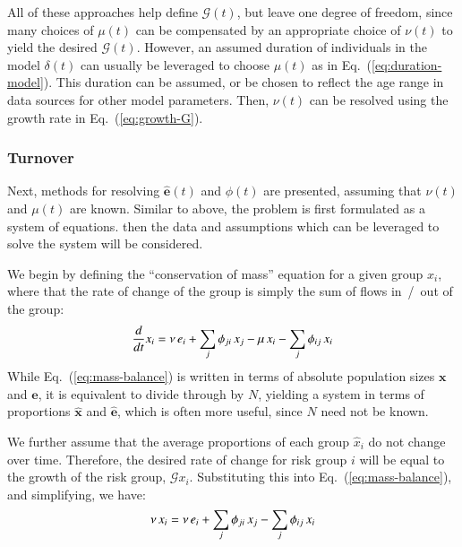 All of these approaches help define $\mathcal{G}(t)$, but leave one degree of freedom,
since many choices of $\mu(t)$ can be compensated by an appropriate choice of $\nu(t)$
to yield the desired $\mathcal{G}(t)$.
However, an assumed duration of individuals in the model $\delta(t)$
can usually be leveraged to choose $\mu(t)$ as in Eq.~(\ref{eq:duration-model}).
This duration can be assumed,
or be chosen to reflect the age range in data sources for other model parameters.
Then, $\nu(t)$ can be resolved using the growth rate in Eq.~(\ref{eq:growth-G}).
\subsubsection{Turnover}\label{sss:params-turnover}
Next, methods for resolving $\bm{\hat{e}}(t)$ and $\phi(t)$
are presented, assuming that $\nu(t)$ and $\mu(t)$ are known.
Similar to above, the problem is first formulated as a system of equations.
then the data and assumptions which can be leveraged to solve the system will be considered.
\par
We begin by defining the ``conservation of mass'' equation for a given group $x_i$,
where that the rate of change of the group
is simply the sum of flows in~/~out of the group:
\begin{equation}\label{eq:mass-balance}
\frac{d}{dt}x_i
= \nu \thinspace e_i + \sum_{j}{\phi_{ji} \thinspace x_j}
- \mu \thinspace x_i - \sum_{j}{\phi_{ij} \thinspace x_i}
\end{equation}
While Eq.~(\ref{eq:mass-balance}) is written in terms of
absolute population sizes $\bm{x}$ and $\bm{e}$,
it is equivalent to divide through by $N$, yielding a system in terms of
proportions $\bm{\hat{x}}$ and $\bm{\hat{e}}$,
which is often more useful, since $N$ need not be known.
\par
We further assume that the average proportions of each group $\hat{x}_i$ do not change over time.
Therefore, the desired rate of change for risk group $i$
will be equal to the growth of the risk group, $\mathcal{G} x_i$.
Substituting this into Eq.~(\ref{eq:mass-balance}),
and simplifying, we have:
\begin{equation}\label{eq:system}
\nu \thinspace x_i
= \nu \thinspace e_i + \sum_{j}{\phi_{ji} \thinspace x_j}
- \sum_{j}{\phi_{ij} \thinspace x_i}
\end{equation}
